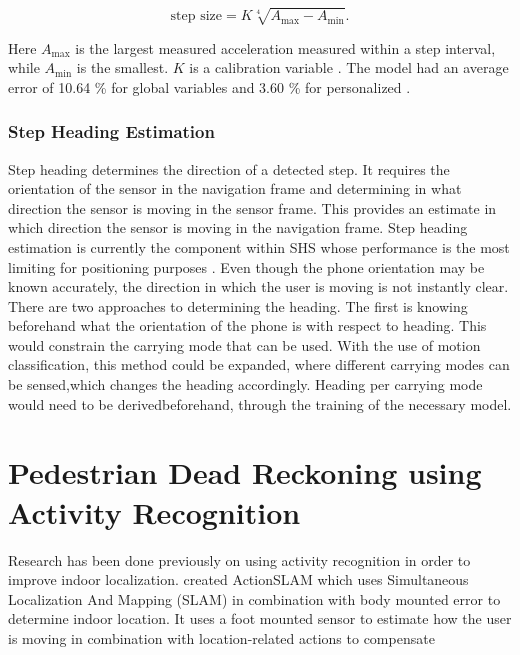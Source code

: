 \begin{equation}
	\text{step size} =K \sqrt[4]{A_{\max }-A_{\min }}.
	\label{eq:weinberg_stepsize}
\end{equation}

Here $A_{\max}$ is the largest measured acceleration measured within a step interval, while $A_{\min}$ is the smallest. $K$ is a calibration variable  \cite{Weinberg2002,Diez2018}. The model had an average error of  10.64 \% for global variables and  3.60 \% for personalized \cite{Vezocnik2019}.

\subsubsection{Step Heading Estimation}
Step heading determines the direction of a detected step. It requires the orientation of the sensor in the navigation frame and determining in what direction the sensor is moving in the sensor frame. This provides an estimate in which direction the sensor is moving in the navigation frame.  Step heading estimation is currently the component within SHS whose performance is the most limiting for positioning purposes \cite{Diez2018b, Qian2013,Combettes2017}.
Even though the phone orientation may be known accurately, the direction in which the user is moving is not instantly clear. There are two approaches to determining the heading. The first is knowing beforehand what the orientation of the phone is with respect to heading.  This would constrain the carrying mode that can be used.  With the use of motion classification, this method could be expanded, where different carrying modes can be sensed,which changes the heading accordingly. Heading per carrying mode would need to be derivedbeforehand, through the training of the necessary model. 

\section{Pedestrian Dead Reckoning using Activity Recognition}
Research has been done previously on using activity recognition in order to improve indoor localization. \citet{Hardegger2012} created ActionSLAM which uses Simultaneous Localization And Mapping (SLAM) in combination with body mounted error to determine indoor location. It uses a foot mounted sensor to estimate how the user is moving in combination with location-related actions to compensate 



